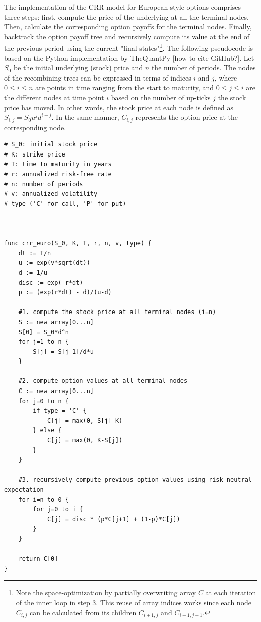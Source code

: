 \documentclass[english,12pt,a4paper,pdftex,sci,utf8]{aaltothesis}
\begin{document}
The implementation of the CRR model for European-style options comprises three steps: first, compute the price of the underlying at all the terminal nodes. Then, calculate the corresponding option payoffs for the terminal nodes. Finally, backtrack the option payoff tree and recursively compute its value at the end of the previous period using the current "final states"\footnote{Note the space-optimization by partially overwriting array $C$ at each iteration of the inner loop in step 3. This reuse of array indices works since each node $C_{i,j}$ can be calculated from its children $C_{i+1,j}$ and $C_{i+1,j+1}$.}. The following pseudocode is based on the Python implementation by TheQuantPy [how to cite GitHub?]. Let $S_0$ be the initial underlying (stock) price and $n$ the number of periods. The nodes of the recombining trees can be expressed in terms of indices $i$ and $j$, where $0 \leq i \leq n$ are points in time ranging from the start to maturity, and $0 \le j \le i$ are the different nodes at time point $i$ based on the number of up-ticks $j$ the stock price has moved. In other words, the stock price at each node is defined as $S_{i,j} = S_0u^jd^{i-j}$. In the same manner, $C_{i,j}$ represents the option price at the corresponding node.

\begin{verbatim}
# S_0: initial stock price
# K: strike price 
# T: time to maturity in years
# r: annualized risk-free rate
# n: number of periods
# v: annualized volatility
# type ('C' for call, 'P' for put)



func crr_euro(S_0, K, T, r, n, v, type) {
    dt := T/n
    u := exp(v*sqrt(dt))
    d := 1/u
    disc := exp(-r*dt)
    p := (exp(r*dt) - d)/(u-d)

    #1. compute the stock price at all terminal nodes (i=n)
    S := new array[0...n]
    S[0] = S_0*d^n
    for j=1 to n {
        S[j] = S[j-1]/d*u
    }

    #2. compute option values at all terminal nodes
    C := new array[0...n]
    for j=0 to n {
        if type = 'C' {
            C[j] = max(0, S[j]-K)
        } else {
            C[j] = max(0, K-S[j])
        }
    }

    #3. recursively compute previous option values using risk-neutral expectation
    for i=n to 0 {
        for j=0 to i {
            C[j] = disc * (p*C[j+1] + (1-p)*C[j])
        }
    }

    return C[0]
}
\end{verbatim}
\end{document}
